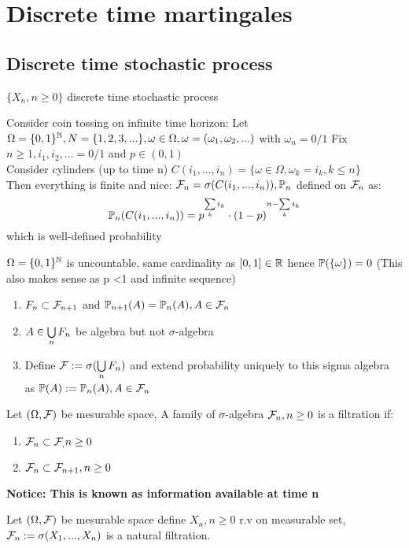 \newpage
\section{Discrete time martingales}
\subsection*{Discrete time stochastic process}

$\{X_n, n\geq 0\}$ discrete time stochastic process
\begin{example}
Consider coin tossing on infinite time horizon: Let $\Omega = \{0,1\}^{\mathbb{N}}, N = \{1,2,3,...\}, \omega\in\Omega, \omega = (\omega_1, \omega_2, ...)$ with $\omega_n = 0/1$
Fix $n\geq 1,i_1,i_2, ... = 0/1$ and $p \in (0,1)$ \\
Consider cylinders (up to time n) $C(i_1, ..., i_n) = \{\omega\in\Omega, \omega_k = i_k, k\leq n\}$ \\
Then everything is finite and nice:
$\mathcal{F}_n = \sigma(C(i_1, ..., i_n)), \mathbb{P}_n$ defined on $\mathcal{F}_n$ as:
\begin{equation*}
    \mathbb{P}_n(C(i_1, ..., i_n)) = p^{\sum\limits_{k}i_k}\cdot (1-p)^{n-\sum\limits_{k}i_k}
\end{equation*}which is well-defined probability
\end{example}

\begin{rem}
$\Omega = \{0,1\}^{\mathbb{N}}$ is uncountable, same cardinality as $[0,1]\in\mathbb{R}$ hence $\mathbb{P}(\{\omega\}) = 0$ (This also makes sense as p <1 and infinite sequence)
\begin{enumerate}
    \item $F_n \subset \mathcal{F}_{n+1}$ and $\mathbb{P}_{n+1}(A)= \mathbb{P}_n(A), A\in \mathcal{F}_n$
    \item $A\in\bigcup\limits_{n}F_n$ be algebra but not $\sigma$-algebra
    \item Define $\mathcal{F} := \sigma(\bigcup\limits_{n}F_n)$ and extend probability uniquely to this sigma algebra as $\mathbb{P}(A) := \mathbb{P}_n(A), A\in\mathcal{F}_n$
\end{enumerate}
\end{rem}
\vspace{2cm}
\begin{dfn}[Filtration] Let $(\Omega, \mathcal{F})$ be mesurable space, A family of $\sigma$-algebra $\mathcal{F}_n, n\geq 0$ is a filtration if:
\begin{enumerate}
    \item $\mathcal{F}_n\subset\mathcal{F}_, n\geq 0$
    \item $\mathcal{F}_n \subset \mathcal{F}_{n+1}, n\geq 0$
\end{enumerate}
\end{dfn}
\textbf{Notice: This is known as information available at time n}
\begin{example}
Let $(\Omega, \mathcal{F})$ be mesurable space define $X_n, n\geq 0$ r.v on measurable set, $\mathcal{F}_n := \sigma(X_1, ..., X_n)$ is a natural filtration.
\end{example}

